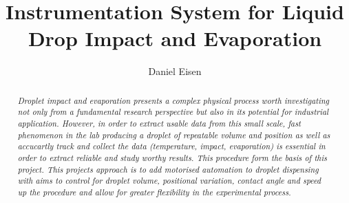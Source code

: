 \documentclass[11pt, a4paper, twoside, openright]{report}
\title{Instrumentation System for Liquid Drop Impact and Evaporation}
\author{Daniel Eisen}
\date{}
\begin{document}
\frontmatter

\begin{abstract}

    \textit{Droplet impact and evaporation presents a complex physical process worth investigating not only from a fundamental research perspective but also in its potential for industrial application. However, in order to extract usable data from this small scale, fast phenomenon in the lab producing a droplet of repeatable volume and position as well as accucartly track and collect the data (temperature, impact, evaporation) is essential in order to extract reliable and study worthy results. This procedure form the basis of this project.
    This projects approach is to add motorised automation to droplet dispensing with aims to control for droplet volume, positional variation, contact angle and speed up the procedure and allow for greater flexibility in the experimental process.}


\end{abstract}


\maketitle



\tableofcontents

\mainmatter









\backmatter





\end{document}
